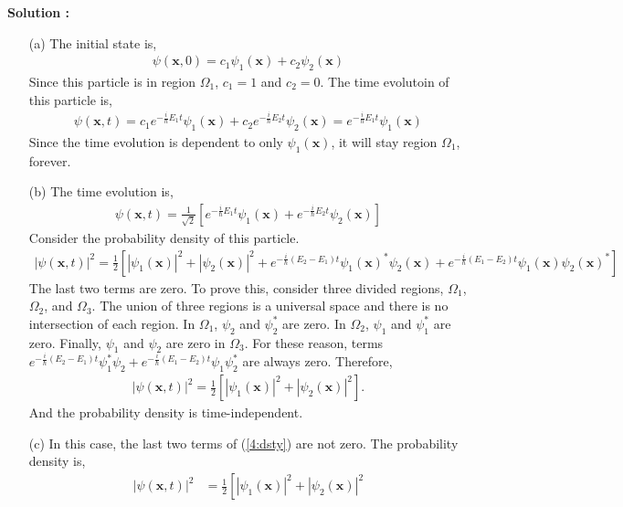 \documentclass[floatfix,nofootinbib,superscriptaddress,fleqn]{revtex4-2}
\begin{document}
\noindent \textbf{Solution : }
\begin{itemize}
\item[(a)] The initial state is,
  \begin{align*}
    \psi(\bm{x},0) = c_1\psi_1(\bm{x})+c_2\psi_2(\bm{x})
  \end{align*} 
  Since this particle is in region $\Omega_1$, $c_1=1$ and $c_2=0$. 
  The time evolutoin of this particle is,
  \begin{align*}
    \psi(\bm{x},t) = c_1e^{-\frac{i}{\hbar}E_1t}\psi_1(\bm{x})
    +c_2e^{-\frac{i}{\hbar}E_2t}\psi_2(\bm{x}) 
    = e^{-\frac{i}{\hbar}E_1t}\psi_1(\bm{x})
  \end{align*}
  Since the time evolution is dependent to only $\psi_1(\bm{x})$, 
  it will stay region $\Omega_1$, 
  forever.
\item[(b)]
  The time evolution is,
  \begin{align*}
    \psi(\bm{x},t) = \frac{1}{\sqrt{2}}\left[
      e^{-\frac{i}{\hbar}E_1t}\psi_1(\bm{x})
    +e^{-\frac{i}{\hbar}E_2t}\psi_2(\bm{x})\right]
  \end{align*}
  Consider the probability density of this particle.
  \begin{align}\label{4:dsty}
    |\psi(\bm{x},t)|^2 = \frac{1}{2}\left[|\psi_1(\bm{x})|^2 
    +|\psi_2(\bm{x})|^2
    +e^{-\frac{i}{\hbar}(E_2-E_1)t}\psi_1(\bm{x})^*\psi_2(\bm{x})
    +e^{-\frac{i}{\hbar}(E_1-E_2)t}\psi_1(\bm{x})\psi_2(\bm{x})^*\right]
  \end{align}
  The last two terms are zero. To prove this, consider three divided regions, 
  $\Omega_1$, $\Omega_2$, and $\Omega_3$. The union of three regions is a
  universal space and there is no intersection of each region. In $\Omega_1$,
  $\psi_2$ and $\psi_2^*$ are zero. In $\Omega_2$, $\psi_1$ and $\psi_1^*$
  are zero. Finally, $\psi_1$ and $\psi_2$ are zero in $\Omega_3$.
  For these reason, terms $e^{-\frac{i}{\hbar}(E_2-E_1)t}\psi_1^*\psi_2
    +e^{-\frac{i}{\hbar}(E_1-E_2)t}\psi_1\psi_2^*$ are always zero.
  Therefore, 
  \begin{align}
    |\psi(\bm{x},t)|^2=\frac{1}{2}\left[|\psi_1(\bm{x})|^2
  +|\psi_2(\bm{x})|^2 \right]. 
  \end{align}
  And the probability density is time-independent.
\item[(c)]In this case, the last two terms of (\ref{4:dsty}) are not zero. 
The probability density is,
  \begin{align*}
    |\psi(\bm{x},t)|^2&= \frac{1}{2}\left[|\psi_1(\bm{x})|^2 
    +|\psi_2(\bm{x})|^2

\end{align*}
\end{itemize}
\end{document}
